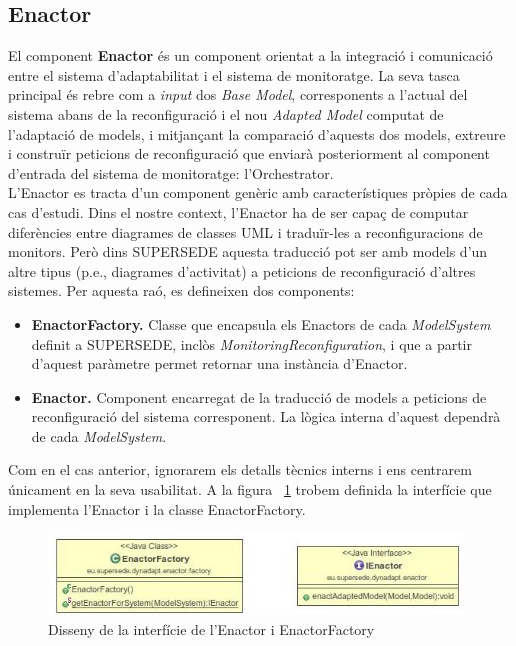 \subsection{Enactor}

El component \textbf{Enactor} és un component orientat a la integració i comunicació entre el sistema d'adaptabilitat i el sistema de monitoratge. La seva tasca principal és rebre com a \textit{input} dos \textit{Base Model}, corresponents a l'actual del sistema abans de la reconfiguració i el nou \textit{Adapted Model} computat de l'adaptació de models, i mitjançant la comparació d'aquests dos models, extreure i construïr peticions de reconfiguració que enviarà posteriorment al component d'entrada del sistema de monitoratge: l'Orchestrator.\\

L'Enactor es tracta d'un component genèric amb característiques pròpies de cada cas d'estudi. Dins el nostre context, l'Enactor ha de ser capaç de computar diferències entre diagrames de classes UML i traduïr-les a reconfiguracions de monitors. Però dins SUPERSEDE aquesta traducció pot ser amb models d'un altre tipus (p.e., diagrames d'activitat) a peticions de reconfiguració d'altres sistemes. Per aquesta raó, es defineixen dos components:

\begin{itemize}
\item \textbf{EnactorFactory.} Classe que encapsula els Enactors de cada \textit{ModelSystem} definit a SUPERSEDE, inclòs \textit{MonitoringReconfiguration}, i que a partir d'aquest paràmetre permet retornar una instància d'Enactor.
\item \textbf{Enactor.} Component encarregat de la traducció de models a peticions de reconfiguració del sistema corresponent. La lògica interna d'aquest dependrà de cada \textit{ModelSystem}.
\end{itemize}

Com en el cas anterior, ignorarem els detalls tècnics interns i ens centrarem únicament en la seva usabilitat. A la figura ~\ref{fig:Figura24} trobem definida la interfície que implementa l'Enactor i la classe EnactorFactory.

\begin{figure}
\centering
\includegraphics[width=11cm]{Figures/Figure24}
\decoRule
\caption{Disseny de la interfície de l'Enactor i EnactorFactory}
\label{fig:Figura24}
\end{figure}

